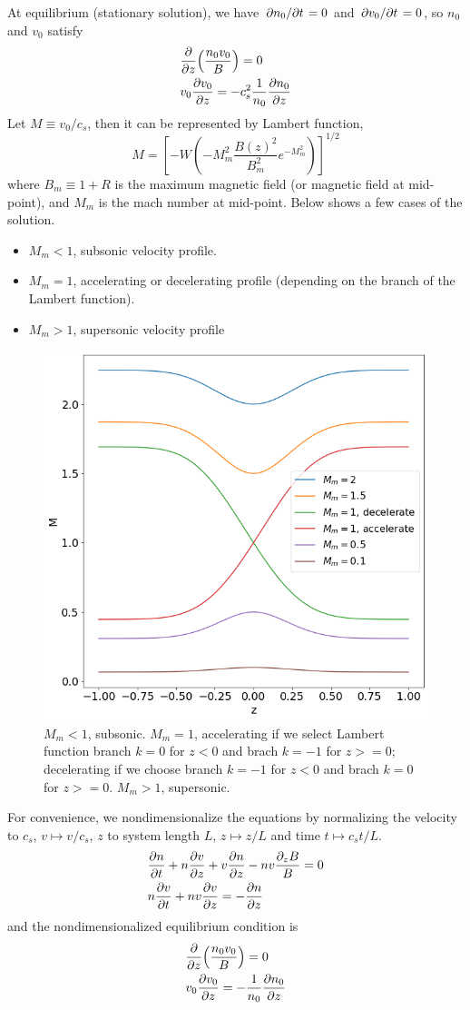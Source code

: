 \documentclass{article}
\theoremstyle{plain}
\theoremstyle{definition}
\theoremstyle{remark}
\theoremstyle{remark}
\begin{document}
At equilibrium (stationary solution), we have $\pdv*{n_0}{t}=0$ and $\pdv*{v_0}{t}=0$, so $n_0$ and $v_0$ satisfy
\begin{align*}
    &\pdv{z}(\frac{n_0v_0}{B}) = 0 \\
    &v_0\pdv{v_0}{z} = -c_s^2\frac{1}{n_0}\pdv{n_0}{z} 
\end{align*}
Let $M\equiv v_0/c_s$, then it can be represented by Lambert function, 
\[ M = \left[ -W\left(-M_m^2 \frac{B(z)^2}{B_m^2}e^{-M_m^2}\right) \right]^{1/2} \]
where $B_m\equiv 1+R$ is the maximum magnetic field (or magnetic field at mid-point), and $M_m$ is the mach number at mid-point. Below shows a few cases of the solution.
\begin{itemize}
    \item $M_m < 1$, subsonic velocity profile.
    \item $M_m = 1$, accelerating or decelerating profile (depending on the branch of the Lambert function).
    \item $M_m > 1$, supersonic velocity profile
\end{itemize}
\begin{figure}[H]
    \centering
    \includegraphics[width=0.7\linewidth]{img/nozzle-velocity-profile.png}
    \caption{$M_m < 1$, subsonic. $M_m = 1$, accelerating if we select Lambert function branch $k=0$ for $z<0$ and brach $k=-1$ for $z>=0$; decelerating if we choose branch $k=-1$ for $z<0$ and brach $k=0$ for $z>=0$. $M_m > 1$, supersonic.}
    \label{fig:nozzle-velocity-profile}
\end{figure}

For convenience, we nondimensionalize the equations by normalizing the velocity to $c_s$, $v\mapsto v/c_s$, $z$ to system length $L$, $z \mapsto z/L$ and time $t\mapsto c_s t/L$.
\begin{align}
    &\pdv{n}{t} + n\pdv{v}{z} + v\pdv{n}{z} - nv\frac{\partial_z B}{B} = 0 \\
    &n\pdv{v}{t} + nv\pdv{v}{z} = -\pdv{n}{z}
\end{align}
and the nondimensionalized equilibrium condition is
\begin{align}
    &\pdv{z}(\frac{n_0v_0}{B}) = 0 \label{eq:equilibrium-convervation-of-mass}\\
    &v_0\pdv{v_0}{z} = -\frac{1}{n_0}\pdv{n_0}{z} \label{eq:equilibrium-convervation-of-momentum}
\end{align}
\end{document}
